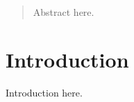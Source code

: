 \documentclass[12pt]{article}
\begin{document}
\maketitle

\begin{abstract}
Abstract here.
\end{abstract}

\section{Introduction}

Introduction here.







\end{document}
